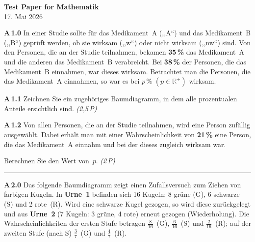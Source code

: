 \documentclass[12pt, a4paper]{article}
\newcommand{\punkte}[1]{\hfill \textit{(#1\,P)}}
\newcommand{\aufg}[1]{\medskip\noindent\textbf{A\,#1}\quad}
\begin{document}
\begin{center}
  {\LARGE\bfseries Test Paper for Mathematik}\\[0.4em]
{ 17. Mai 2026}\\[0.3em]
\end{center}



\bigskip

\bigskip

\aufg{1.0}
In einer Studie sollte für das Medikament~A (,,A``) und das Medikament~B (,,B``)
geprüft werden, ob sie wirksam (,,w``) oder nicht wirksam (,,nw``) sind.
Von den Personen, die an der Studie teilnahmen, bekamen \textbf{35\,\%} das
Medikament~A und die anderen das Medikament~B verabreicht.
Bei \textbf{38\,\%} der Personen, die das Medikament~B einnahmen, war dieses wirksam.
Betrachtet man die Personen, die das Medikament~A einnahmen, so war es bei
$p$\,\% $(p \in \mathbb{R}^+)$ wirksam.

\aufg{1.1}
Zeichnen Sie ein zugehöriges Baumdiagramm, in dem alle prozentualen Anteile
ersichtlich sind.
\punkte{2{,}5}

\vspace{2cm}

\aufg{1.2}
Von allen Personen, die an der Studie teilnahmen, wird eine Person zufällig
ausgewählt. Dabei erhält man mit einer Wahrscheinlichkeit von \textbf{21\,\%}
eine Person, die das Medikament~A einnahm und bei der dieses zugleich wirksam war.

Berechnen Sie den Wert von~$p$.
\punkte{2}

\vspace{4cm}

\bigskip
\hrule
\bigskip

\aufg{2.0}
Das folgende Baumdiagramm zeigt einen Zufallsversuch zum Ziehen von farbigen Kugeln.
In \textbf{Urne~1} befinden sich 16 Kugeln: 8 grüne (G), 6 schwarze (S) und 2 rote~(R).
Wird eine schwarze Kugel gezogen, so wird diese zurückgelegt und aus
\textbf{Urne~2} (7 Kugeln: 3 grüne, 4 rote) erneut gezogen (Wiederholung).
Die Wahrscheinlichkeiten der ersten Stufe betragen
$\tfrac{8}{16}$~(G), $\tfrac{6}{16}$~(S) und $\tfrac{2}{16}$~(R);
auf der zweiten Stufe (nach S) $\tfrac{3}{7}$~(G) und $\tfrac{4}{7}$~(R).
\end{document}
